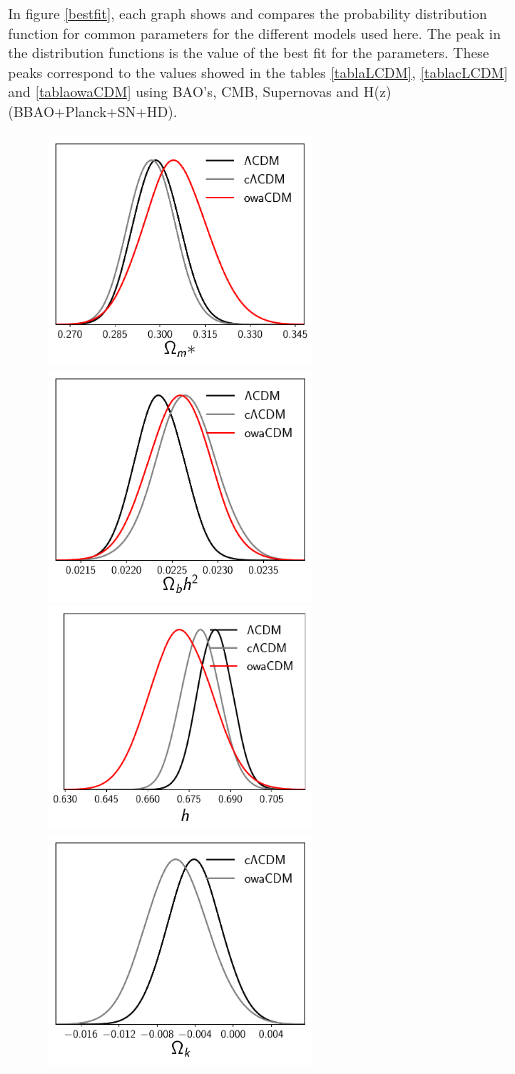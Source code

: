 \documentclass[onecolumn,           %
               showpacs,            %
               preprintnumbers,     %
               aps,                 %
               letterpaper,             %
               superscriptaddress,      %
               nofootinbib,         %
               tightenlines,        %
               floats,floatfix      %
               ,usenatbib,
               ]{revtex4-1}
\begin{document}
In figure \ref{bestfit}, each graph shows and compares the probability distribution function for common parameters for the different models used here. The peak in the distribution functions is the value of the best fit for the parameters. These peaks correspond to the values showed in the tables \ref{tablaLCDM}, \ref{tablacLCDM} and \ref{tablaowaCDM} using BAO's, CMB, Supernovas and H(z) (BBAO+Planck+SN+HD).
\begin{figure}[htp]
	\centering
	\includegraphics[width=7cm]{FiguresCosmo/Om_best_fit.pdf}	
	\includegraphics[width=7cm]{FiguresCosmo/Obh2_best_fit.pdf}
	\includegraphics[width=7cm]{FiguresCosmo/h_best_fit.pdf}
	\includegraphics[width=7cm]{FiguresCosmo/Ok_best_fit.pdf}

\end{figure}
\end{document}
